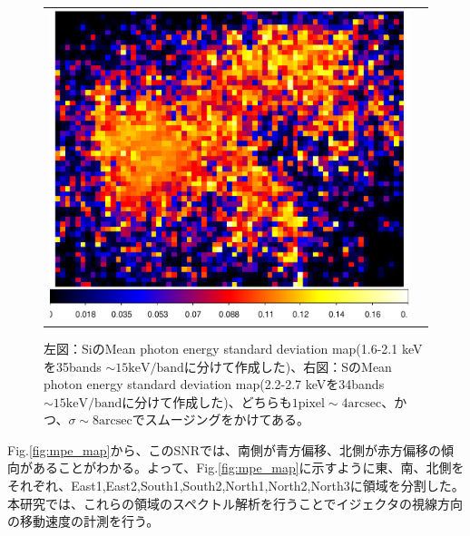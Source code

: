 \documentclass[a4j]{jarticle}%
\begin{document}
\begin{figure}[H]
\begin{center}
\begin{tabular}{cc}
  \begin{minipage}{0.5\hsize}
  \begin{center}
  \includegraphics[scale=0.45]{./S_mean_std.eps}
  \end{center}
  \end{minipage}
  \end{tabular}
  \caption{左図：SiのMean photon energy standard deviation map(1.6-2.1 keVを35bands $\sim 15 \textrm{keV/band}$に分けて作成した)、右図：SのMean photon energy standard deviation map(2.2-2.7 keVを34bands $\sim 15 \textrm{keV/band}$に分けて作成した)、どちらも$1\textrm{pixel} \sim 4\textrm{arcsec}$、かつ、$\sigma \sim 8\textrm{arcsec}$でスムージングをかけてある。}
  \label{fig:std_map}
  \end{center}
\end{figure}
  Fig.\ref{fig:mpe_map}から、このSNRでは、南側が青方偏移、北側が赤方偏移の傾向があることがわかる。よって、Fig.\ref{fig:mpe_map}に示すように東、南、北側をそれぞれ、East1,East2,South1,South2,North1,North2,North3に領域を分割した。
本研究では、これらの領域のスペクトル解析を行うことでイジェクタの視線方向の移動速度の計測を行う。
\end{document}
